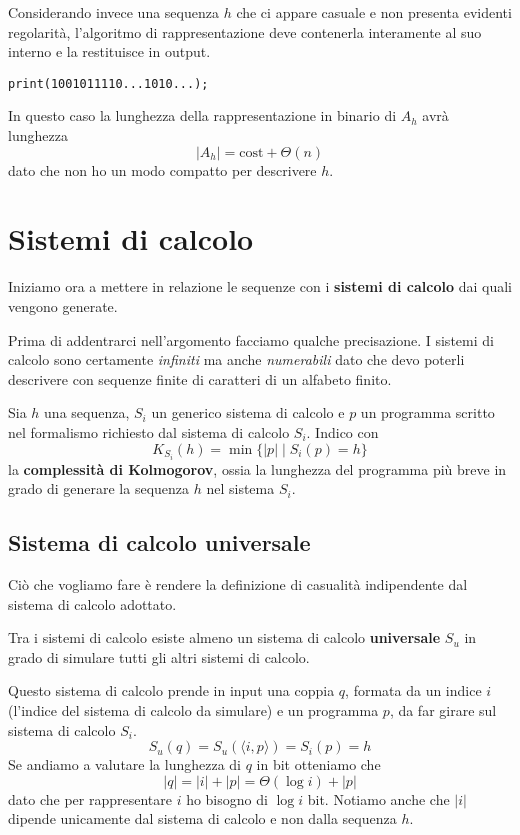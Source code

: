 \begin{example}
	Considerando invece una sequenza $h$ che ci appare casuale e non presenta evidenti regolarit\`a, l'algoritmo di
	rappresentazione deve contenerla interamente al suo interno e la restituisce in output.
	\begin{lstlisting}[style=pseudo-style]
	print(1001011110...1010...);
	\end{lstlisting}
	In questo caso la lunghezza della rappresentazione in binario di $A_h$ avr\`a lunghezza
	\[ |A_h| = \text{cost} + \Theta(n) \]
	dato che non ho un modo compatto per descrivere $h$.
\end{example}

\section{Sistemi di calcolo}\label{sistemi_calcolo}
Iniziamo ora a mettere in relazione le sequenze con i \textbf{sistemi di calcolo} dai quali vengono generate.

Prima di addentrarci nell'argomento facciamo qualche precisazione. I sistemi di calcolo sono certamente \emph{infiniti}
ma anche \emph{numerabili} dato che devo poterli descrivere con sequenze finite di caratteri di un alfabeto finito.

\begin{definition}
	Sia $h$ una sequenza, $S_i$ un generico sistema di calcolo e $p$ un programma scritto nel formalismo richiesto dal
	sistema di calcolo $S_i$. Indico con
	\[ K_{S_i}(h) = \min\{ |p| \mid S_i(p) = h \} \]
	la \textbf{complessit\`a di Kolmogorov}, ossia la lunghezza del programma pi\`u breve in grado di generare la
	sequenza $h$ nel sistema $S_i$.
\end{definition}

\subsection{Sistema di calcolo universale}
Ci\`o che vogliamo fare \`e rendere la definizione di casualit\`a indipendente dal sistema di calcolo adottato.

Tra i sistemi di calcolo esiste almeno un sistema di calcolo \textbf{universale} $S_u$ in grado di simulare tutti gli
altri sistemi di calcolo.

Questo sistema di calcolo prende in input una coppia $q$, formata da un indice $i$ (l'indice del sistema di calcolo da
simulare) e un programma $p$, da far girare sul sistema di calcolo $S_i$.
\[ S_u(q) =  S_u (\langle i, p \rangle) = S_i (p) = h \]
Se andiamo a valutare la lunghezza di $q$ in bit otteniamo che
\[ |q| = |i| + |p| = \Theta (\log i) + |p| \]
dato che per rappresentare $i$ ho bisogno di $\log i$ bit. Notiamo anche che $|i|$ dipende unicamente dal sistema di
calcolo e non dalla sequenza $h$.

